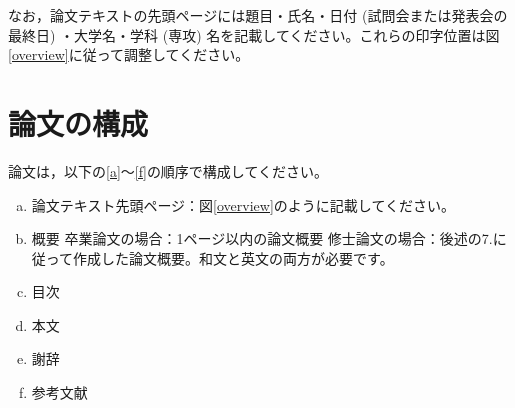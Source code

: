 \documentclass[12pt]{kupaper}
\begin{document}
なお，論文テキストの先頭ページには題目・氏名・日付 (試問会または発表会の最終日) ・大学名・学科 (専攻) 名を記載してください。これらの印字位置は図\ref{overview}に従って調整してください。


\chapter{論文の構成} \label{論文の構成}
論文は，以下の\ref{a}～\ref{f}の順序で構成してください。



\begin{enumerate}[a.]
	\item 論文テキスト先頭ページ：図\ref{overview}のように記載してください。\label{a}
	\item 概要\label{b}
	      卒業論文の場合：1ページ以内の論文概要
	      修士論文の場合：後述の7.に従って作成した論文概要。和文と英文の両方が必要です。
	\item 目次\label{c}
	\item 本文\label{d}
	\item 謝辞\label{e}
	\item 参考文献\label{f}
\end{enumerate}
\end{document}
